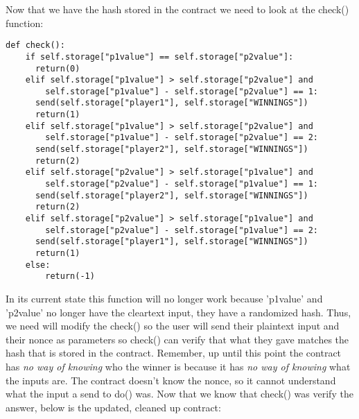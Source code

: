 \documentclass[12pt]{article}
\begin{document}
Now that we have the hash stored in the contract we need to look at the check() function:

\begin{lstlisting}[frame=single]
def check():
	if self.storage["p1value"] == self.storage["p2value"]:
	  return(0)
	elif self.storage["p1value"] > self.storage["p2value"] and 
	    self.storage["p1value"] - self.storage["p2value"] == 1:
	  send(self.storage["player1"], self.storage["WINNINGS"]) 
	  return(1)
	elif self.storage["p1value"] > self.storage["p2value"] and 
	    self.storage["p1value"] - self.storage["p2value"] == 2:
	  send(self.storage["player2"], self.storage["WINNINGS"])
	  return(2)
	elif self.storage["p2value"] > self.storage["p1value"] and 
	    self.storage["p2value"] - self.storage["p1value"] == 1:
	  send(self.storage["player2"], self.storage["WINNINGS"])		
	  return(2)
	elif self.storage["p2value"] > self.storage["p1value"] and 
	    self.storage["p2value"] - self.storage["p1value"] == 2:
	  send(self.storage["player1"], self.storage["WINNINGS"])		
	  return(1)
	else:
		return(-1)
\end{lstlisting}

In its current state this function will no longer work because 'p1value' and 'p2value' no longer have the cleartext input, they have a randomized hash. Thus, we need will modify the check() so the user will send their plaintext input and their nonce as parameters so check() can verify that what they gave matches the hash that is stored in the contract. Remember, up until this point the contract has \textit{no way of knowing} who the winner is because it has \textit{no way of knowing} what the inputs are. The contract doesn't know the nonce, so it cannot understand what the input a send to do() was. Now that we know that check() was verify the answer, below is the updated, cleaned up contract:
\end{document}

